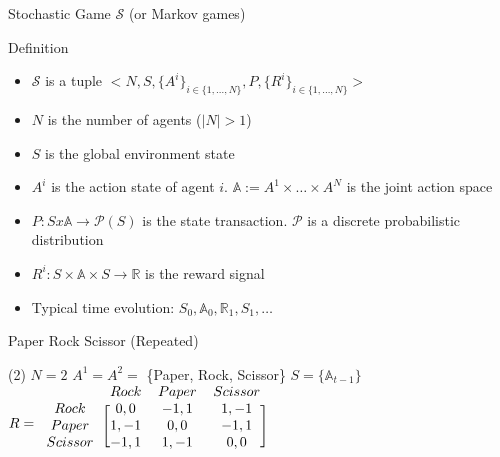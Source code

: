 \documentclass[presentation, 9pt]{beamer}\mode<presentation>{\usetheme{AMSBolognaFC}}
\begin{document}
\begin{frame}[c]{Stochastic Game $\mathcal{S}$ (or Markov games)}
	\begin{alertblock}{Definition}
		\begin{itemize}
			\item $\mathcal{S}$ is a tuple $<N, S, \{A^i\}_{i \in \{ 1, \dots, N\}}, P, \{R^i\}_{i \in \{ 1, \dots, N\}}>$
			\item $N$ is the number of agents ($|N| > 1 $)
			\item $S$ is the global environment state
			\item $A^i$ is the action state of agent $i$. $\mathbb{A} := A^1 \times \dots\times A^N$ is the joint action space
			\item $P: S x \mathbb{A} \rightarrow \mathcal{P}(S)$ is the state transaction. $\mathcal{P}$ is a discrete probabilistic distribution %
			\item $R^i: S \times \mathbb{A} \times S \rightarrow \mathbb{R}$ is the reward signal
			\item Typical time evolution: $ S_0, \mathbb{A}_0, \mathbb{R}_1, S_1, \dots  $
		\end{itemize}
	\end{alertblock}
	\begin{exampleblock}{Paper Rock Scissor (Repeated)}
		\begin{tasks}(2)
			\task $N = 2$
			\task $A^1 = A^2 = $ \{Paper, Rock, Scissor\}
			\task $S = \{ \mathbb{A}_{t-1} \} $
			\task $R = \begin{blockarray}{cccc}
        & Rock & Paper & Scissor \\
      \begin{block}{c[ccc]}
        Rock    & 0, 0  & -1, 1 & 1, -1 \\
        Paper   & 1, -1 & 0, 0  & -1, 1 \\
        Scissor & -1, 1 & 1, -1 & 0, 0 \\
      \end{block}
    \end{blockarray}$
		\end{tasks}
	\end{exampleblock}
\end{frame}
\end{document}
